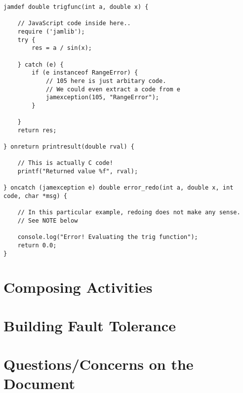 \documentclass[11pt]{article}
\begin{document}
\begin{lstlisting}[caption=An activity definition example,label=lst2]
jamdef double trigfunc(int a, double x) {

    // JavaScript code inside here..
    require ('jamlib');
    try {
        res = a / sin(x);

    } catch (e) {
        if (e instanceof RangeError) {
            // 105 here is just arbitary code.
            // We could even extract a code from e
            jamexception(105, "RangeError");
        }

    }
    return res;

} onreturn printresult(double rval) {

    // This is actually C code!
    printf("Returned value %f", rval);

} oncatch (jamexception e) double error_redo(int a, double x, int code, char *msg) {

    // In this particular example, redoing does not make any sense.
    // See NOTE below

    console.log("Error! Evaluating the trig function");
    return 0.0;
}
\end{lstlisting}


\section{Composing Activities}





\section{Building Fault Tolerance}





\section{Questions/Concerns on the Document}
\end{document}
